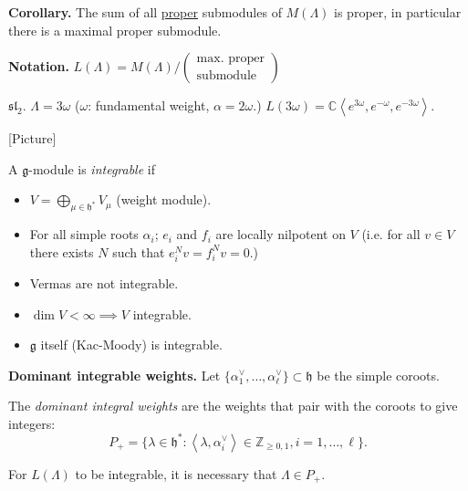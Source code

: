 {\bf Corollary.} The sum of all  \underline{proper} submodules 
of  $M(\Lambda)$ is proper, in particular
there is a maximal proper submodule.

{\bf Notation.} $L(\Lambda)=M(\Lambda)\Big/\left(\substack{
\text{max. proper} \\ \text{submodule}}\right)$

\begin{example}
\label{example-}
$\mathfrak{sl}_2$. $\Lambda=3\omega$ ($\omega$: fundamental weight,
$\alpha=2\omega$.) 
$L(3\omega)=\mathbb{C}\left<e^{3\omega},e^{-\omega},e^{-3\omega}\right>$.

[Picture]
\end{example}

\begin{definition}
\label{definition-integrable-g-module}
A $\mathfrak{g}$-module is {\it integrable} if
\begin{itemize}
\item $V=\bigoplus_{\mu \in \mathfrak{h}^*}V_\mu$ (weight module).
\item For all simple roots $\alpha_i$; $e_i$ and $f_i$ are
locally nilpotent on $V$ (i.e. for all $v \in V$
there exists $N$ such that
$e_i^Nv=f_i^Nv=0$.)
\end{itemize}
\end{definition}

\begin{remark}
\label{remark-integrability}
\begin{itemize}
\item Vermas are not integrable.
\item $\dim V< \infty \implies V$ integrable.
\item $\mathfrak{g}$ itself (Kac-Moody) is integrable.
\end{itemize}
\end{remark}

\medskip\noindent
{\bf Dominant integrable weights.} 
Let $\{\alpha_1^\vee,\ldots,\alpha_\ell^\vee\}\subset\mathfrak{h}$ be the simple
coroots.

\begin{definition}
\label{definition-dominant-integral-weights}
The {\it dominant integral weights} are the weights that pair with the coroots
to give integers:
$$
P_+=\{\lambda \in \mathfrak{h}^* :
\left<\lambda,\alpha_i^\vee\right>\in\mathbb{Z}_{\geq 0,1},
i=1,\ldots,\ell\}.
$$
\end{definition}

For $L(\Lambda)$ to be integrable, it is necessary that $\Lambda \in P_+$.


